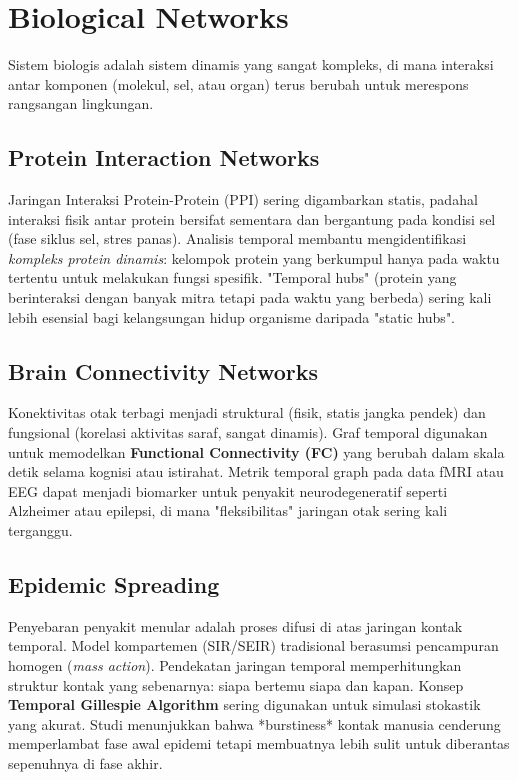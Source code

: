 \documentclass[12pt,a4paper]{book}
\begin{document}
\chapter{Biological Networks}
Sistem biologis adalah sistem dinamis yang sangat kompleks, di mana interaksi antar komponen (molekul, sel, atau organ) terus berubah untuk merespons rangsangan lingkungan.

\section{Protein Interaction Networks}
Jaringan Interaksi Protein-Protein (PPI) sering digambarkan statis, padahal interaksi fisik antar protein bersifat sementara dan bergantung pada kondisi sel (fase siklus sel, stres panas).
Analisis temporal membantu mengidentifikasi \textit{kompleks protein dinamis}: kelompok protein yang berkumpul hanya pada waktu tertentu untuk melakukan fungsi spesifik. "Temporal hubs" (protein yang berinteraksi dengan banyak mitra tetapi pada waktu yang berbeda) sering kali lebih esensial bagi kelangsungan hidup organisme daripada "static hubs".

\section{Brain Connectivity Networks}
Konektivitas otak terbagi menjadi struktural (fisik, statis jangka pendek) dan fungsional (korelasi aktivitas saraf, sangat dinamis).
Graf temporal digunakan untuk memodelkan \textbf{Functional Connectivity (FC)} yang berubah dalam skala detik selama kognisi atau istirahat. Metrik temporal graph pada data fMRI atau EEG dapat menjadi biomarker untuk penyakit neurodegeneratif seperti Alzheimer atau epilepsi, di mana "fleksibilitas" jaringan otak sering kali terganggu.

\section{Epidemic Spreading}
Penyebaran penyakit menular adalah proses difusi di atas jaringan kontak temporal.
Model kompartemen (SIR/SEIR) tradisional berasumsi pencampuran homogen (\textit{mass action}). Pendekatan jaringan temporal memperhitungkan struktur kontak yang sebenarnya: siapa bertemu siapa dan kapan.
Konsep \textbf{Temporal Gillespie Algorithm} sering digunakan untuk simulasi stokastik yang akurat. Studi menunjukkan bahwa *burstiness* kontak manusia cenderung memperlambat fase awal epidemi tetapi membuatnya lebih sulit untuk diberantas sepenuhnya di fase akhir.
\end{document}
